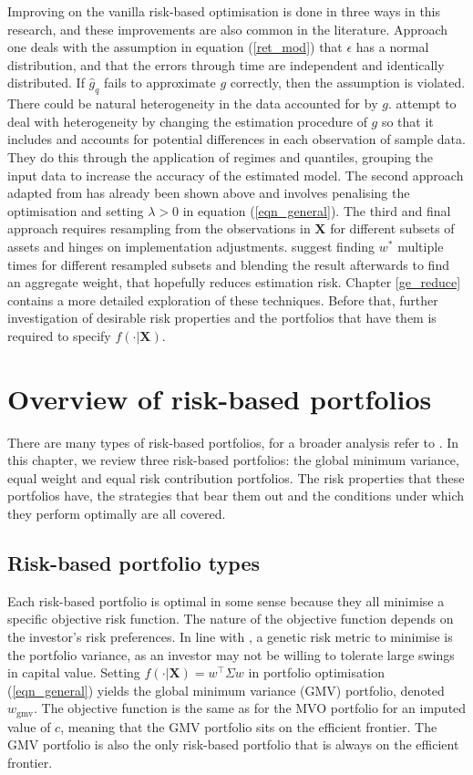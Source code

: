 \documentclass[a4paper,11pt,nocenter,bold,noupper,headcount]{mythesis}
\theoremstyle{plain}
\theoremstyle{definition}
\begin{document}
Improving on the vanilla risk-based optimisation is done in three ways in this research, and these improvements are also common in the literature. Approach one deals with the assumption in equation (\ref{ret_mod}) that $\epsilon$ has a normal distribution, and that the errors through time are independent and identically distributed. If $\hat{g}_q$ fails to approximate $g$ correctly, then the assumption is violated. There could be natural heterogeneity in the data accounted for by $g$. \cite{FD18} attempt to deal with heterogeneity by changing the estimation procedure of ${g}$ so that it includes and accounts for potential differences in each observation of sample data. They do this through the application of regimes and quantiles, grouping the input data to increase the accuracy of the estimated model. The second approach adapted from \cite{K18} has already been shown above and involves penalising the optimisation and setting $\lambda > 0$ in equation (\ref{eqn_general}). The third and final approach requires resampling from the observations in $\textbf{X}$ for different subsets of assets and hinges on implementation adjustments. \cite{SW17} suggest finding $w^*$ multiple times for different resampled subsets and blending the result afterwards to find an aggregate weight, that hopefully reduces estimation risk. Chapter \ref{ge_reduce} contains a more detailed exploration of these techniques. Before that, further investigation of desirable risk properties and the portfolios that have them is required to specify $f(\cdot|\textbf{X})$.

\chapter{Overview of risk-based portfolios}  \label{rb_ports}

There are many types of risk-based portfolios, for a broader analysis refer to \cite{DV17}. In this chapter, we review three risk-based portfolios: the global minimum variance, equal weight and equal risk contribution portfolios. The risk properties that these portfolios have, the strategies that bear them out and the conditions under which they perform optimally are all covered.

\section{Risk-based portfolio types}
Each risk-based portfolio is optimal in some sense because they all minimise a specific objective risk function. The nature of the objective function depends on the investor's risk preferences. In line with \cite{M52}, a genetic risk metric to minimise is the portfolio variance, as an investor may not be willing to tolerate large swings in capital value. Setting $f(\cdot|\textbf{X}) = w^\intercal \Sigma w$ in portfolio optimisation (\ref{eqn_general}) yields the global minimum variance (GMV) portfolio, denoted $w_\textrm{gmv}$. The objective function is the same as for the MVO portfolio for an imputed value of $c$, meaning that the GMV portfolio sits on the efficient frontier. The GMV portfolio is also the only risk-based portfolio that is always on the efficient frontier.
\end{document}
